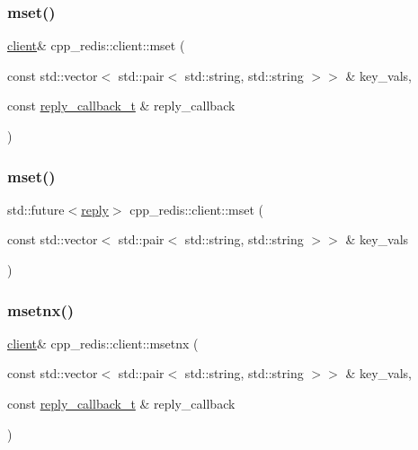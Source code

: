 \mbox{\label{classcpp__redis_1_1client_acd9e2a69abc97bb7735425fdaebe788d}} 
\subsubsection{\texorpdfstring{mset()}{mset()}\hspace{0.1cm}{\footnotesize\ttfamily [1/2]}}
{\footnotesize\ttfamily \hyperlink{classcpp__redis_1_1client}{client}\& cpp\+\_\+redis\+::client\+::mset (\begin{DoxyParamCaption}\item[{const std\+::vector$<$ std\+::pair$<$ std\+::string, std\+::string $>$$>$ \&}]{key\+\_\+vals,  }\item[{const \hyperlink{classcpp__redis_1_1client_a061a1140d36d2eaeda82b09a0bb3f9f2}{reply\+\_\+callback\+\_\+t} \&}]{reply\+\_\+callback }\end{DoxyParamCaption})}

\mbox{\label{classcpp__redis_1_1client_a369f84ea90c49095a3222d6f210410f8}} 
\subsubsection{\texorpdfstring{mset()}{mset()}\hspace{0.1cm}{\footnotesize\ttfamily [2/2]}}
{\footnotesize\ttfamily std\+::future$<$\hyperlink{classcpp__redis_1_1reply}{reply}$>$ cpp\+\_\+redis\+::client\+::mset (\begin{DoxyParamCaption}\item[{const std\+::vector$<$ std\+::pair$<$ std\+::string, std\+::string $>$$>$ \&}]{key\+\_\+vals }\end{DoxyParamCaption})}

\mbox{\label{classcpp__redis_1_1client_ae04ade1f429088a437a4ea618a465a18}} 
\subsubsection{\texorpdfstring{msetnx()}{msetnx()}\hspace{0.1cm}{\footnotesize\ttfamily [1/2]}}
{\footnotesize\ttfamily \hyperlink{classcpp__redis_1_1client}{client}\& cpp\+\_\+redis\+::client\+::msetnx (\begin{DoxyParamCaption}\item[{const std\+::vector$<$ std\+::pair$<$ std\+::string, std\+::string $>$$>$ \&}]{key\+\_\+vals,  }\item[{const \hyperlink{classcpp__redis_1_1client_a061a1140d36d2eaeda82b09a0bb3f9f2}{reply\+\_\+callback\+\_\+t} \&}]{reply\+\_\+callback }\end{DoxyParamCaption})}

